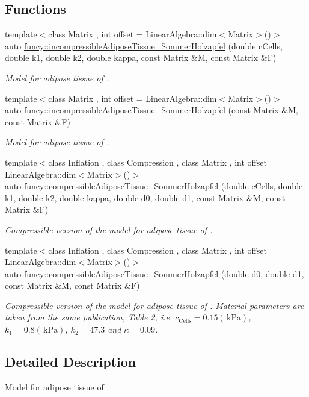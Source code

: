 \subsection*{Functions}
\begin{DoxyCompactItemize}
\item 
{\footnotesize template$<$class Matrix , int offset = Linear\-Algebra\-::dim$<$\-Matrix$>$()$>$ }\\auto \hyperlink{group__Biomechanics_ga36560a89b598664a05bbf66db532e6fc}{funcy\-::incompressible\-Adipose\-Tissue\-\_\-\-Sommer\-Holzapfel} (double c\-Cells, double k1, double k2, double kappa, const Matrix \&M, const Matrix \&F)
\begin{DoxyCompactList}\small\item\em Model for adipose tissue of \cite{Sommer2013}. \end{DoxyCompactList}\item 
{\footnotesize template$<$class Matrix , int offset = Linear\-Algebra\-::dim$<$\-Matrix$>$()$>$ }\\auto \hyperlink{group__Biomechanics_gad6b4e5cb05913af7dac9f7d854709ea1}{funcy\-::incompressible\-Adipose\-Tissue\-\_\-\-Sommer\-Holzapfel} (const Matrix \&M, const Matrix \&F)
\begin{DoxyCompactList}\small\item\em Model for adipose tissue of \cite{Sommer2013}. \end{DoxyCompactList}\item 
{\footnotesize template$<$class Inflation , class Compression , class Matrix , int offset = Linear\-Algebra\-::dim$<$\-Matrix$>$()$>$ }\\auto \hyperlink{group__Biomechanics_ga264309c6dd9f2a888a058bbe28545cad}{funcy\-::compressible\-Adipose\-Tissue\-\_\-\-Sommer\-Holzapfel} (double c\-Cells, double k1, double k2, double kappa, double d0, double d1, const Matrix \&M, const Matrix \&F)
\begin{DoxyCompactList}\small\item\em Compressible version of the model for adipose tissue of \cite{Sommer2013}. \end{DoxyCompactList}\item 
{\footnotesize template$<$class Inflation , class Compression , class Matrix , int offset = Linear\-Algebra\-::dim$<$\-Matrix$>$()$>$ }\\auto \hyperlink{group__Biomechanics_ga3d3cb526ca5269746febe677b2ea04a4}{funcy\-::compressible\-Adipose\-Tissue\-\_\-\-Sommer\-Holzapfel} (double d0, double d1, const Matrix \&M, const Matrix \&F)
\begin{DoxyCompactList}\small\item\em Compressible version of the model for adipose tissue of \cite{Sommer2013}. Material parameters are taken from the same publication, Table 2, i.\-e. $c_\mathrm{Cells}=0.15 (\,\mathrm{kPa})$, $k_1=0.8 (\,\mathrm{kPa})$, $k_2=47.3$ and $\kappa=0.09$. \end{DoxyCompactList}\end{DoxyCompactItemize}


\subsection{Detailed Description}
Model for adipose tissue of \cite{Sommer2013}. 